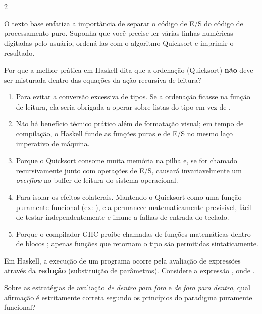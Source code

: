 \documentclass[a4paper,10pt,brazil]{article}
\begin{document}
\begin{multicols}{2}
\begin{enumerate}
\end{enumerate}

O texto base enfatiza a importância de separar o código de E/S do código de processamento puro. Suponha que você precise ler várias linhas numéricas digitadas pelo usuário, ordená-las com o algoritmo Quicksort e imprimir o resultado. 

Por que a melhor prática em Haskell dita que a ordenação (Quicksort) \textbf{não} deve ser misturada dentro das equações da ação recursiva de leitura?

\begin{enumerate}
  \item Para evitar a conversão excessiva de tipos. Se a ordenação ficasse na função de leitura, ela seria obrigada a operar sobre listas do tipo \haskellinline{[IO Int]} em vez de \haskellinline{[Int]}.

  \item Não há benefício técnico prático além de formatação visual; em tempo de compilação, o Haskell funde as funções puras e de E/S no mesmo laço imperativo de máquina.

  \item Porque o Quicksort consome muita memória na pilha e, se for chamado recursivamente junto com operações de E/S, causará invariavelmente um \emph{overflow} no buffer de leitura do sistema operacional.

  \item Para isolar os efeitos colaterais. Mantendo o Quicksort como uma função puramente funcional (ex: \haskellinline{[Int] -> [Int]}), ela permanece matematicamente previsível, fácil de testar independentemente e imune a falhas de entrada do teclado.

  \item Porque o compilador GHC proíbe chamadas de funções matemáticas dentro de blocos ; apenas funções que retornam o tipo  são permitidas sintaticamente.


\end{enumerate}

Em Haskell, a execução de um programa ocorre pela avaliação de expressões através da \textbf{redução} (substituição de parâmetros). Considere a expressão , onde . 

Sobre as estratégias de avaliação \emph{de dentro para fora} e \emph{de fora para dentro}, qual afirmação é estritamente correta segundo os princípios do paradigma puramente funcional?


\end{multicols}
\end{document}
